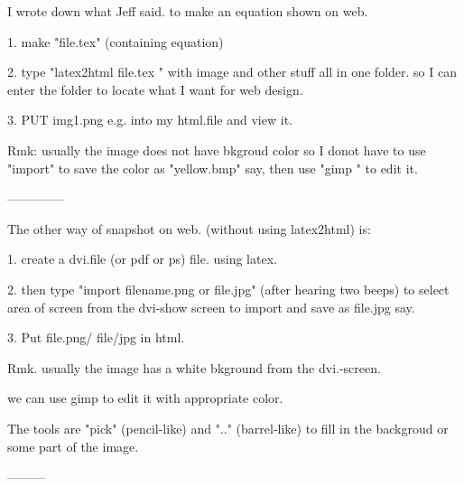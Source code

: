 I wrote down what Jeff said. to make an equation shown on web.


1. make  "file.tex"  (containing equation)

2. type "latex2html file.tex "
with image and other stuff all in one folder. so I can enter the folder 
to locate what I want for web design.

3. PUT img1.png e.g. into my html.file and view it. 

Rmk: usually the image does not have bkgroud color so I donot have to
use "import" to save the color as "yellow.bmp" say, then use "gimp "
to edit it.

--------------

The other way of snapshot on web. (without using latex2html) is:

1. create a dvi.file (or pdf or ps) file.   using latex.

2. then type "import filename.png or file.jpg" (after hearing two 
beeps) to select area of screen
from the dvi-show screen to import and save as file.jpg say.

3.  Put file.png/ file/jpg in html.  


Rmk.  usually the image has a white bkground from the dvi.-screen.

we can use gimp to edit it with appropriate color.

The tools are "pick" (pencil-like) and ".." (barrel-like) to fill in the 
backgroud or some part of the image.

---------






